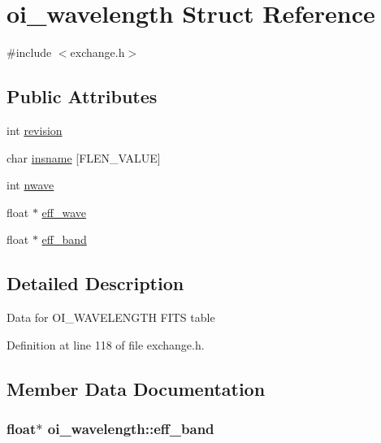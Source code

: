 \hypertarget{structoi__wavelength}{
\section{oi\_\-wavelength Struct Reference}
\label{structoi__wavelength}
}


{\ttfamily \#include $<$exchange.h$>$}

\subsection*{Public Attributes}
\begin{DoxyCompactItemize}
\item 
int \hyperlink{structoi__wavelength_ab1a73161490a72249b8afefb231fcc85}{revision}
\item 
char \hyperlink{structoi__wavelength_abb40f6cfe8257b0f2193c62cb29782e5}{insname} \mbox{[}FLEN\_\-VALUE\mbox{]}
\item 
int \hyperlink{structoi__wavelength_aca523aaa717b16de29f32c88705d0803}{nwave}
\item 
float $\ast$ \hyperlink{structoi__wavelength_a42f864640bef01df797a93df3b83b269}{eff\_\-wave}
\item 
float $\ast$ \hyperlink{structoi__wavelength_a3654323e3347cb6e5cba84c7a6d74af2}{eff\_\-band}
\end{DoxyCompactItemize}


\subsection{Detailed Description}
Data for OI\_\-WAVELENGTH FITS table 

Definition at line 118 of file exchange.h.



\subsection{Member Data Documentation}
\hypertarget{structoi__wavelength_a3654323e3347cb6e5cba84c7a6d74af2}{
\subsubsection[{eff\_\-band}]{\setlength{\rightskip}{0pt plus 5cm}float$\ast$ {\bf oi\_\-wavelength::eff\_\-band}}}
\label{structoi__wavelength_a3654323e3347cb6e5cba84c7a6d74af2}



